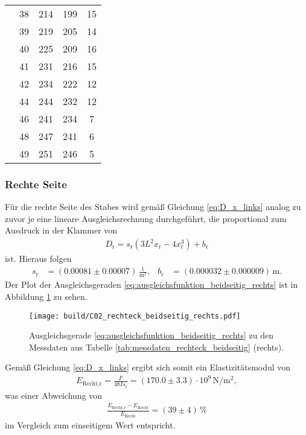 \begin{table}[H]
\begin{tabular}[]{S S[table-format = 2.0] S S S[table-format = 2.0]}
                 & 38 & 214 & 199 & 15 \\
                 & 39 & 219 & 205 & 14 \\
                 & 40 & 225 & 209 & 16 \\
                 & 41 & 231 & 216 & 15 \\
                 & 42 & 234 & 222 & 12 \\
                 & 44 & 244 & 232 & 12 \\
                 & 46 & 241 & 234 &  7 \\
                 & 48 & 247 & 241 &  6 \\
                 & 49 & 251 & 246 &  5 \\
        \bottomrule
    \end{tabular}
\end{table}

\subsubsection{Rechte Seite}
Für die rechte Seite des Stabes wird gemäß Gleichung \eqref{eq:D_x_links} analog zu zuvor je eine lineare Ausgleichsrechnung durchgeführt,
die proportional zum Ausdruck in der Klammer von
\begin{align}
    D_\text{r} = s_\text{r} \left(3 L^2 x_\text{r} - 4 x_\text{r}^3\right) + b_\text{r}
    \label{eq:ausgleichsfunktion_beidseitig_rechts}
\end{align}
ist.
Hieraus folgen 
\begin{align*}
    s_\text{r} &= (\num{0.00081} \pm \num{0.00007}) \, \frac{1}{\unit{\meter^2}}, & 
    b_\text{r} &= (\num{0.000032} \pm \num{0.000009}) \, \unit{\meter}.
\end{align*}
Der Plot der Ausgleichsgeraden \eqref{eq:ausgleichsfunktion_beidseitig_rechts} ist in Abbildung \ref{fig:plot_rechteck_beidseitig_rechts}
zu sehen.
%
\begin{figure}[H]
    \centering
    \texttt{[image: build/C02\_rechteck\_beidseitig\_rechts.pdf]}
    \caption{Ausgleichsgerade \eqref{eq:ausgleichsfunktion_beidseitig_rechts} zu den Messdaten aus Tabelle \ref{tab:messdaten_rechteck_beidseitig} (rechts).}
    \label{fig:plot_rechteck_beidseitig_rechts}
\end{figure}

\noindent
Gemäß Gleichung \eqref{eq:D_x_links} ergibt sich somit ein Elastizitätsmodul von 
\begin{align}
    E_\text{Recht,r} = \frac{F}{48 I s_\text{r}} = (\num{170.0} \pm \num{3.3}) \cdot 10^9 \, \unit{\newton\per\meter^2},
\end{align}
was einer Abweichung von 
\begin{align*}
    \frac{E_\text{Recht,r} - E_\text{Recht}}{E_\text{Recht}} = (\num{39} \pm \num{4}) \, \%
\end{align*}
im Vergleich zum einseitigem Wert entspricht.




